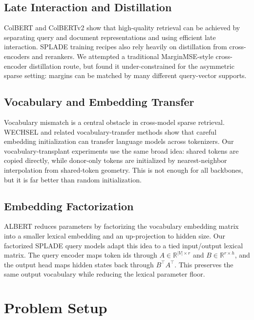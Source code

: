 \documentclass[
]{ceurart}
\begin{document}
\subsection{Late Interaction and Distillation}

ColBERT and ColBERTv2 \cite{Santhanam2022ColBERTv2} show that high-quality
retrieval can be achieved by separating query and document representations and
using efficient late interaction. SPLADE training recipes also rely heavily on
distillation from cross-encoders and rerankers. We attempted a traditional
MarginMSE-style cross-encoder distillation route, but found it under-constrained
for the asymmetric sparse setting: margins can be matched by many different
query-vector supports.

\subsection{Vocabulary and Embedding Transfer}

Vocabulary mismatch is a central obstacle in cross-model sparse retrieval.
WECHSEL \cite{Minixhofer2022WECHSEL} and related vocabulary-transfer methods
show that careful embedding initialization can transfer language models across
tokenizers. Our vocabulary-transplant experiments use the same broad idea:
shared tokens are copied directly, while donor-only tokens are initialized by
nearest-neighbor interpolation from shared-token geometry. This is not enough
for all backbones, but it is far better than random initialization.

\subsection{Embedding Factorization}

ALBERT \cite{Lan2020ALBERT} reduces parameters by factorizing the vocabulary
embedding matrix into a smaller lexical embedding and an up-projection to hidden
size. Our factorized SPLADE query models adapt this idea to a tied
input/output lexical matrix. The query encoder maps token ids through
$A \in \mathbb{R}^{|V| \times r}$ and $B \in \mathbb{R}^{r \times h}$, and the
output head maps hidden states back through $B^\top A^\top$. This preserves the
same output vocabulary while reducing the lexical parameter floor.

\section{Problem Setup}
\end{document}
